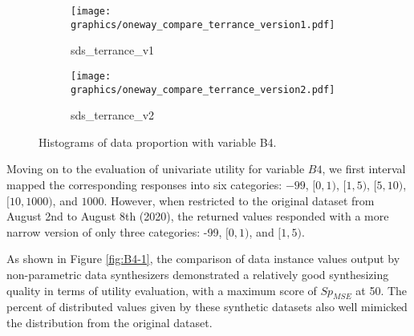 \newpage
\begin{figure}[H]\ContinuedFloat
\begin{center}
    \begin{subfigure}{0.32\textwidth}
        \centering
        \texttt{[image: graphics/oneway\_compare\_terrance\_version1.pdf]}  
        \caption{sds\_terrance\_v1}
        \label{subfig:terrancev1b4}
    \end{subfigure}
    \begin{subfigure}{0.32\textwidth}
        \centering
        \texttt{[image: graphics/oneway\_compare\_terrance\_version2.pdf]}  
        \caption{sds\_terrance\_v2}
        \label{subfig:terrancev2b4}
    \end{subfigure}
\end{center}
    \caption[]{Histograms of data proportion with variable B4.}
    \label{fig:B4-3}
\end{figure}
Moving on to the evaluation of univariate utility for variable $B4$, we first interval mapped the corresponding responses into six categories: $-99$, $[0, 1)$, $[1, 5)$, $[5, 10)$, $[10, 1000)$, and $1000$. However, when restricted to the original dataset from August 2nd to August 8th (2020), the returned values responded with a more narrow version of only three categories: -99, $[0, 1)$, and $[1, 5)$.

As shown in Figure \ref{fig:B4-1}, the comparison of data instance values output by non-parametric data synthesizers demonstrated a relatively good synthesizing quality in terms of utility evaluation, with a maximum score of $Sp_{MSE}$ at 50. The percent of distributed values given by these synthetic datasets also well mimicked the distribution from the original dataset.

